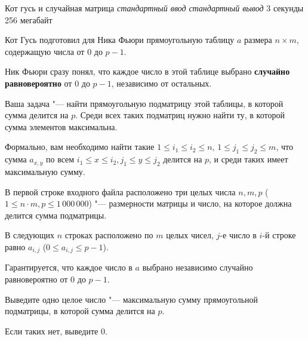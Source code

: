 \begin{problem}%
{Кот гусь и случайная матрица}%
{\textsl{стандартный ввод}}%
{\textsl{стандартный вывод}}%
{3 секунды}%
{256 мегабайт}{}

Кот Гусь подготовил для Ника Фьюри прямоугольную таблицу $a$ размера $n \times m$, содержащую числа от $0$ до $p-1$. 

Ник Фьюри сразу понял, что каждое число в этой таблице выбрано \textbf{случайно равновероятно} от $0$ до $p-1$, независимо от остальных.

Ваша задача "--- найти прямоугольную подматрицу этой таблицы, в которой сумма делится на $p$. Среди всех таких подматриц нужно найти ту, в которой сумма элементов максимальна.

Формально, вам необходимо найти такие $1 \leq i_1 \leq i_2 \leq n$, $1 \leq j_1 \leq j_2 \leq m$, что сумма $a_{x, y}$ по всем $i_1 \leq x \leq i_2, j_1 \leq y \leq j_2$ делится на $p$, и среди таких имеет максимальную сумму.

\InputFile

В первой строке входного файла расположено три целых числа $n, m, p$ ($1 \leq n \cdot m, p \leq 1\,000\,000$) "--- размерности матрицы и число, на которое должна делится сумма подматрицы.

В следующих $n$ строках расположено по $m$ целых чисел, $j$-е число в $i$-й строке равно $a_{i, j}$ ($0 \leq a_{i, j} \leq p - 1$).


Гарантируется, что каждое число в $a$ выбрано независимо случайно равновероятно от $0$ до $p-1$.

\OutputFile

Выведите одно целое число "--- максимальную сумму прямоугольной подматрицы, в которой сумма делится на $p$.

Если таких нет, выведите $0$.

\Examples

\begin{example}
%
\end{example}
\end{problem}